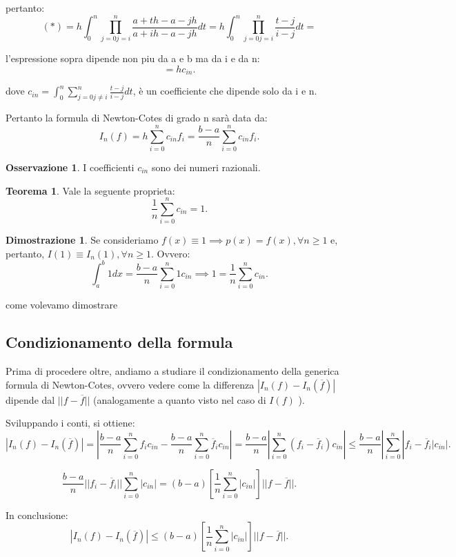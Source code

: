 \documentclass[11pt]{article}
\theoremstyle{definition}
\newtheorem{oss}{Osservazione}
\newtheorem{dimo}{Dimostrazione}
\newtheorem{thm}{Teorema}[section] %
\theoremstyle{plain}
\begin{document}
pertanto:
\[
	(*)=h\int_{0}^{n}\prod_{j=0 j=i}^{n} \frac{a+th-a-jh}{a+ih-a-jh}dt=h\int_{0}^{n}\prod_{j=0 j=i}^{n} \frac{t-j}{i-j}dt=
\] 

l'espressione sopra dipende non piu da a e b ma da i e da n:
\[
=hc_{in}
.\] 

dove $c_{in}=\int_{0}^{n}\sum_{j=0 j\neq i}^{n} \frac{t-j}{i-j}dt$, è un coefficiente che dipende solo da i e n.

Pertanto la formula di Newton-Cotes di grado n sarà data da:
\[
	I_{n}(f)=h\sum_{i=0}^{n} c_{in}f_{i}=\frac{b-a}{n}\sum_{i=0}^{n} c_{in}f_{i}
.\] 

\begin{oss}
	I coefficienti $c_{in}$ sono dei numeri razionali.
\end{oss}

\begin{thm}
	Vale la seguente proprieta:
	\[
	\frac{1}{n}\sum_{i=0}^{n} c_{in}=1
	.\] 
\end{thm}

\begin{dimo}
	Se consideriamo $f(x)\equiv 1 \implies p(x)=f(x),\forall n\ge 1$  e, pertanto, $I(1)\equiv I_{n}(1),\forall n\ge 1$. Ovvero:
	\[
	\int_{a}^{b}1dx=\frac{b-a}{n}\sum_{i=0}^{n} 1c_{in} \implies 1=\frac{1}{n}\sum_{i=0}^{n} c_{in}
	.\] 

come volevamo dimostrare
\end{dimo}

\subsection{Condizionamento della formula}

Prima di procedere oltre, andiamo a studiare il condizionamento della generica formula di Newton-Cotes, ovvero vedere come la differenza $|I_n(f)-I_n(\overline{f})|$ dipende dal $||f-\overline{f}||$ (analogamente a quanto visto nel caso di $I(f)$ ).

Sviluppando i conti, si ottiene:
\[
	|I_n(f)-I_n(\overline{f})|= |\frac{b-a}{n}\sum_{i=0}^{n} f_ic_{in}-\frac{b-a}{n}\sum_{i=0}^{n} \overline{f}_{i}c_{in}|=\frac{b-a}{n}|\sum_{i=0}^{n} (f_i-\overline{f}_{i})c_{in}|\le \frac{b-a}{n}|\sum_{i=0}^{n} |f_i-\overline{f}_{i}|c_{in}|
.\] 

\[
	\frac{b-a}{n}||f_i-\overline{f}_{i}||\sum_{i=0}^{n} |c_{in}|= (b-a)[\frac{1}{n}\sum_{i=0}^{n} |c_{in}|]||f-\overline{f}||
.\] 

In conclusione:
\[
	|I_n(f)-I_n(\overline{f})|\le (b-a)[\frac{1}{n}\sum_{i=0}^{n} |c_{in}|]||f-\overline{f}||
.\] 
\end{document}
